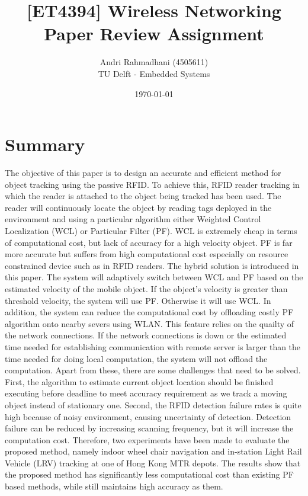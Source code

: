 \documentclass [a4,11pt]{article}
\begin{document}
\title{[ET4394] Wireless Networking \\ Paper Review Assignment}
\author{Andri Rahmadhani (4505611) \\ TU Delft - Embedded Systems}
\date{\today}
\maketitle

\section{Summary}

The objective of this paper is to design an accurate and efficient method for object tracking using the passive RFID. To achieve this, RFID reader tracking in which the reader is attached to the object being tracked has been used. The reader will continuously locate the object by reading tags deployed in the environment and using a particular algorithm either Weighted Control Localization (WCL) or Particular Filter (PF). WCL is extremely cheap in terms of computational cost, but lack of accuracy for a high velocity object. PF is far more accurate but suffers from high computational cost especially on resource constrained device such as in RFID readers. The hybrid solution is introduced in this paper. The system will adaptively switch between WCL and PF based on the estimated velocity of the mobile object. If the object's velocity is greater than threshold velocity, the system will use PF. Otherwise it will use WCL. In addition, the system can reduce the computational cost by offloading costly PF algorithm onto nearby severs using WLAN. This feature relies on the quailty of the network connections. If the network connections is down or the estimated time needed for establishing communication with remote server is larger than the time needed for doing local computation, the system will
not offload the computation. Apart from these, there are some challenges that need to be solved. First, the algorithm to estimate current object location should be finished executing before deadline to meet accuracy requirement as we track a moving object instead of stationary one. Second, the RFID detection failure rates is quite high because of noisy environment, causing uncertainty of detection. Detection failure can be reduced by increasing scanning frequency, but it will increase the computation cost. Therefore, two experiments have been made to evaluate the proposed method, namely indoor wheel chair navigation and in-station Light Rail Vehicle (LRV) tracking at one of Hong Kong MTR depots. The results show that the proposed method has significantly less computational cost than existing PF based methods, while still maintains high accuracy as them.
\end{document}
